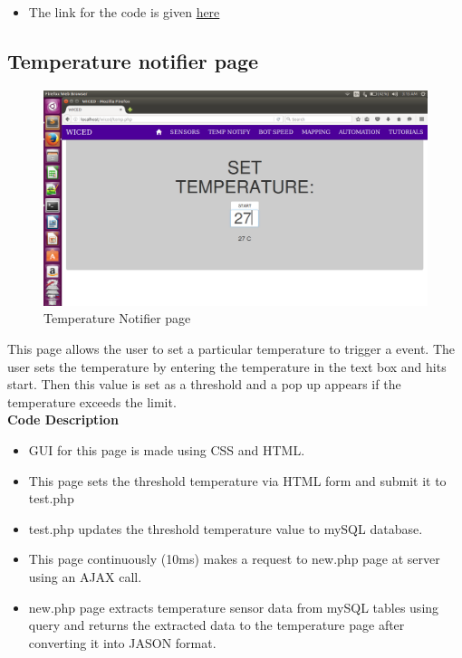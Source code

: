 \documentclass[a4paper,12pt,oneside]{book}
\begin{document}
\begin{itemize}
\begin{itemize}
        \item The link for the code is given \href{https://github.com/eYSIP-2016/Wiced-Sense/blob/master/Codes/wiced%20web/javascript/sensors.js}{here}
        \end{itemize}




\newpage
\subsection{Temperature notifier page}



\begin{figure}[h]
        \centering
    	\includegraphics[scale=0.2]{temp12.png}
    	\caption{Temperature Notifier page}
	    \end{figure}
	    
	    
 This page allows the user to set a particular temperature to trigger a event. The user sets the temperature by entering the temperature in the text box and hits start. Then this value is set as a threshold and a pop up appears if the temperature exceeds the limit.\\

  \textbf{Code Description}
 \begin{itemize}
        \item GUI for this page is made using CSS and HTML.
        \item This page sets the threshold temperature via HTML form and submit it to test.php
        \item test.php updates the threshold temperature value to mySQL database.
        \item This page continuously (10ms) makes a request to new.php page at server using an AJAX call.
        \item new.php page extracts temperature sensor data from mySQL tables using query and returns the extracted data to the temperature page after converting it into JASON format.
        

\end{itemize}
\end{itemize}
\end{document}

